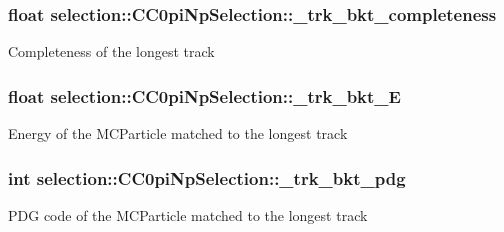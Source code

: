 \subsubsection[{\texorpdfstring{\+\_\+trk\+\_\+bkt\+\_\+completeness}{_trk_bkt_completeness}}]{\setlength{\rightskip}{0pt plus 5cm}float selection\+::\+C\+C0pi\+Np\+Selection\+::\+\_\+trk\+\_\+bkt\+\_\+completeness\hspace{0.3cm}{\ttfamily [private]}}\hypertarget{classselection_1_1CC0piNpSelection_aab22ce289e2d4a109440369e30fddf52}{}\label{classselection_1_1CC0piNpSelection_aab22ce289e2d4a109440369e30fddf52}
Completeness of the longest track 
\subsubsection[{\texorpdfstring{\+\_\+trk\+\_\+bkt\+\_\+E}{_trk_bkt_E}}]{\setlength{\rightskip}{0pt plus 5cm}float selection\+::\+C\+C0pi\+Np\+Selection\+::\+\_\+trk\+\_\+bkt\+\_\+E\hspace{0.3cm}{\ttfamily [private]}}\hypertarget{classselection_1_1CC0piNpSelection_aa7a6076f1169185e0b2b02fbb03aba22}{}\label{classselection_1_1CC0piNpSelection_aa7a6076f1169185e0b2b02fbb03aba22}
Energy of the M\+C\+Particle matched to the longest track 
\subsubsection[{\texorpdfstring{\+\_\+trk\+\_\+bkt\+\_\+pdg}{_trk_bkt_pdg}}]{\setlength{\rightskip}{0pt plus 5cm}int selection\+::\+C\+C0pi\+Np\+Selection\+::\+\_\+trk\+\_\+bkt\+\_\+pdg\hspace{0.3cm}{\ttfamily [private]}}\hypertarget{classselection_1_1CC0piNpSelection_a7044de37ee4f3615ffe4bb15e9f00f8e}{}\label{classselection_1_1CC0piNpSelection_a7044de37ee4f3615ffe4bb15e9f00f8e}
P\+DG code of the M\+C\+Particle matched to the longest track 
